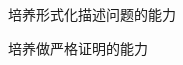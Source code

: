 \begin{frame}{}
  \begin{center}

    \vspace{1.00cm}
    {\large 培养形式化描述问题的能力}

    \vspace{0.60cm}
    {\large 培养做严格证明的能力}
  \end{center}
\end{frame}
